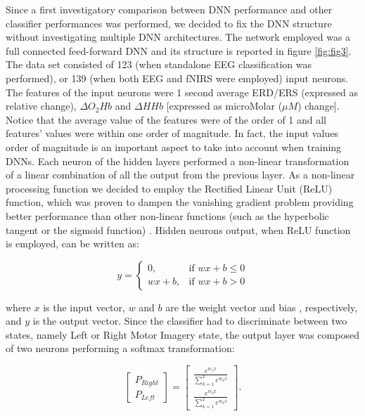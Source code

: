 \documentclass[12pt ]{iopart}
\begin{document}
Since  a first investigatory comparison between DNN performance and other classifier performances was performed, we decided to fix the DNN structure without investigating multiple DNN architectures.
The network employed was a full connected feed-forward DNN and its structure is reported in figure \ref{fig:fig3}.
The data set consisted of 123 (when standalone EEG classification was performed), or 139 (when both EEG and fNIRS were employed) input neurons. 
The features of the input neurons were 1 second average ERD/ERS (expressed as relative change), $\Delta O_{2}Hb$ and $\Delta HHb$ [expressed as microMolar ($\mu M$) change]. Notice that the average value of the features were of the order of 1 and all features' values were within one order of magnitude. In fact, the input values order of magnitude is an important aspect to take into account when training DNNs.
Each neuron of the hidden layers performed a non-linear transformation of a linear combination of all the output from the previous layer. As a non-linear processing function we decided to employ the Rectified Linear Unit (ReLU) function, which was proven to dampen the vanishing gradient problem providing better performance than other non-linear functions (such as the hyperbolic tangent or the sigmoid function) \parencite{dahl2013improving}. Hidden neurons output,  when ReLU function is employed, can be written as:

\begin{equation}
y=
\begin{cases}
0,& \text{if } wx+b \leq 0\\
wx+b,&\text{if } wx+b > 0
\end{cases}
\end{equation}

where $x$ is the input vector, $w$ and $b$ are the weight vector and bias , respectively, and $y$ is the output vector.
Since the classifier had to discriminate between two states, namely Left or Right Motor Imagery state, the output layer was composed of two neurons performing a softmax transformation:

\begin{equation}
\begin{bmatrix}
P_{Right}\\
P_{Left}
\end{bmatrix}
=
\begin{bmatrix}
\frac{e^{w_1x}}{\sum\limits_{k=1}^2 e^{w_kx}}\\
\frac{e^{w_2x}}{\sum\limits_{k=1}^2 e^{w_kx}}
\end{bmatrix}
.
\end{equation}
\end{document}
